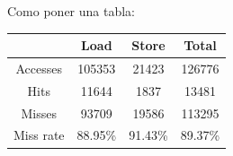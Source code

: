 Como poner una tabla:
\begin{center}
   \begin{tabular}{| c || c | c | c |}
      \hline
      	           & Load	& Store		& Total		\\ \hline \hline
	Accesses   & 105353	& 21423		& 126776	\\ \hline
	Hits       &  11644	&  1837		&  13481	\\ \hline
	Misses     &  93709 	& 19586		& 113295	\\ \hline
	Miss rate  & 88.95\%	& 91.43\%	& 89.37\%	\\ \hline
   \end{tabular}
\end{center}

